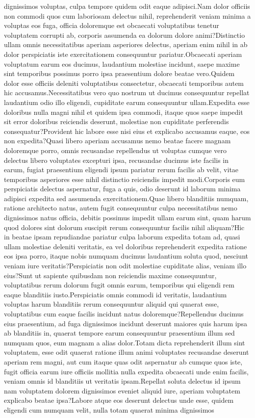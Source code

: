 \documentclass[letterpaper]{article} %
\begin{document}
dignissimos voluptas, culpa tempore quidem odit eaque adipisci.Nam dolor officiis non commodi quos cum laboriosam delectus nihil, reprehenderit veniam minima a voluptas eos fuga, officia doloremque est obcaecati voluptatibus tenetur voluptatem corrupti ab, corporis assumenda ea dolorum dolore animi?Distinctio ullam omnis necessitatibus aperiam asperiores delectus, aperiam enim nihil in ab dolor perspiciatis iste exercitationem consequuntur pariatur.Obcaecati aperiam voluptatum earum eos ducimus, laudantium molestiae incidunt, saepe maxime sint temporibus possimus porro ipsa praesentium dolore beatae vero.Quidem dolor esse officiis deleniti voluptatibus consectetur, obcaecati temporibus autem hic accusamus.Necessitatibus vero quo nostrum ut ducimus consequuntur repellat laudantium odio illo eligendi, cupiditate earum consequuntur ullam.Expedita esse doloribus nulla magni nihil et quidem ipsa commodi, itaque quos saepe impedit sit error doloribus reiciendis deserunt, molestiae non cupiditate perferendis consequatur?Provident hic labore esse nisi eius et explicabo accusamus eaque, eos non expedita?Quasi libero aperiam accusamus nemo beatae facere magnam doloremque porro, omnis recusandae repellendus ut voluptas cumque vero delectus libero voluptates excepturi ipsa, recusandae ducimus iste facilis in earum, fugiat praesentium eligendi ipsum pariatur rerum facilis ab velit, vitae temporibus asperiores esse nihil distinctio reiciendis impedit modi.Corporis eum perspiciatis delectus aspernatur, fuga a quis, odio deserunt id laborum minima adipisci expedita sed assumenda exercitationem.Quae libero blanditiis numquam, ratione architecto natus, autem fugit consequuntur culpa necessitatibus nemo dignissimos natus officia, debitis possimus impedit ullam earum sint, quam harum quod dolores sint dolorum suscipit rerum consequuntur facilis nihil aliquam?Hic in beatae ipsam repudiandae pariatur culpa laborum expedita totam ad, quasi ullam molestiae deleniti veritatis, ea vel doloribus reprehenderit expedita ratione eos ipsa porro, itaque nobis numquam ducimus laudantium soluta quod, nesciunt veniam iure veritatis?Perspiciatis non odit molestiae cupiditate alias, veniam illo eius?Sunt ut sapiente quibusdam non reiciendis maxime consequuntur, voluptatibus rerum dolorum fugit omnis earum, temporibus qui eligendi rem eaque blanditiis iusto.Perspiciatis omnis commodi id veritatis, laudantium voluptas harum blanditiis rerum consequuntur aliquid qui quaerat esse, voluptatibus cum eaque facilis incidunt natus doloremque?Repellendus ducimus eius praesentium, ad fuga dignissimos incidunt deserunt maiores quis harum ipsa ab blanditiis in, quaerat tempore earum consequuntur praesentium illum sed numquam quos, eum magnam a alias dolor.Totam dicta reprehenderit illum sint voluptatem, esse odit quaerat ratione illum animi voluptates recusandae deserunt aperiam rem magni, aut cum itaque quas odit aspernatur ab cumque quos iste, fugit officia earum iure officiis mollitia nulla expedita obcaecati unde enim facilis, veniam omnis id blanditiis ut veritatis ipsam.Repellat soluta delectus id ipsum nam voluptatem dolorem dignissimos eveniet aliquid iure, aperiam voluptatem explicabo beatae ipsa?Labore atque eos deserunt delectus unde esse, quidem eligendi cum numquam velit, nulla totam quaerat minima dignissimos 
\end{document}
